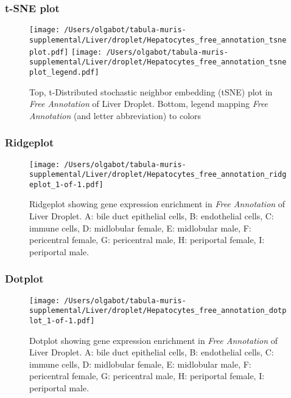 \clearpage
\subsubsection{t-SNE plot}
\begin{figure}[h]
\centering
\texttt{[image: /Users/olgabot/tabula-muris-supplemental/Liver/droplet/Hepatocytes\_free\_annotation\_tsneplot.pdf]}
\texttt{[image: /Users/olgabot/tabula-muris-supplemental/Liver/droplet/Hepatocytes\_free\_annotation\_tsneplot\_legend.pdf]}
\caption{Top, t-Distributed stochastic neighbor embedding (tSNE) plot  in \emph{Free Annotation} of Liver Droplet. Bottom, legend mapping \emph{Free Annotation} (and letter abbreviation) to colors}
\end{figure}


\clearpage

\subsubsection{Ridgeplot}
\begin{figure}[h]
\centering
\texttt{[image: /Users/olgabot/tabula-muris-supplemental/Liver/droplet/Hepatocytes\_free\_annotation\_ridgeplot\_1-of-1.pdf]}

\caption{ Ridgeplot  showing gene expression enrichment in \emph{Free Annotation} of Liver Droplet. A: bile duct epithelial cells, B: endothelial cells, C: immune cells, D: midlobular female, E: midlobular male, F: pericentral female, G: pericentral male, H: periportal female, I: periportal male.}
\end{figure}


\clearpage

\subsubsection{Dotplot}
\begin{figure}[h]
\centering
\texttt{[image: /Users/olgabot/tabula-muris-supplemental/Liver/droplet/Hepatocytes\_free\_annotation\_dotplot\_1-of-1.pdf]}

\caption{ Dotplot  showing gene expression enrichment in \emph{Free Annotation} of Liver Droplet. A: bile duct epithelial cells, B: endothelial cells, C: immune cells, D: midlobular female, E: midlobular male, F: pericentral female, G: pericentral male, H: periportal female, I: periportal male.}
\end{figure}


